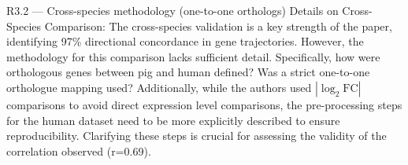 \documentclass[11pt,a4paper]{article}
\begin{document}
\begin{reviewerbox}{R3.2 — Cross-species methodology (one-to-one orthologs)}
Details on Cross-Species Comparison: The cross-species validation is a key
strength of the paper, identifying 97\% directional concordance in gene
trajectories. However, the methodology for this comparison lacks sufficient
detail. Specifically, how were orthologous genes between pig and human
defined? Was a strict one-to-one orthologue mapping used? Additionally, while
the authors used $|\log_2 \mathrm{FC}|$ comparisons to avoid direct expression
level comparisons, the pre-processing steps for the human dataset need to be
more explicitly described to ensure reproducibility. Clarifying these steps is
crucial for assessing the validity of the correlation observed (r=0.69).
\end{reviewerbox}
\end{document}
